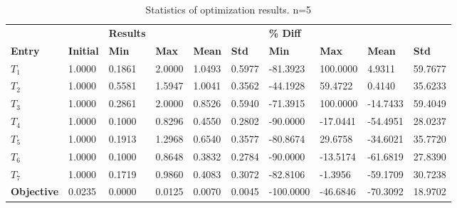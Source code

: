 \begin{table}[H]
\centering
\begin{tabular}{llllllllll}
\textbf{} & \textbf{} & \cellcolor[HTML]{EFEFEF}\textbf{Results} & \cellcolor[HTML]{EFEFEF} & \cellcolor[HTML]{EFEFEF} & \cellcolor[HTML]{EFEFEF} & \cellcolor[HTML]{EFEFEF}\textbf{\% Diff} & \cellcolor[HTML]{EFEFEF} & \cellcolor[HTML]{EFEFEF} & \cellcolor[HTML]{EFEFEF} \\
\rowcolor[HTML]{EFEFEF} 
\textbf{Entry} & \textbf{Initial} & \textbf{Min} & \textbf{Max} & \textbf{Mean} & \textbf{Std} & \textbf{Min} & \textbf{Max} & \textbf{Mean} & \textbf{Std} \\
$T_1$ & 1.0000 & 0.1861 & 2.0000 & 1.0493 & 0.5977 & -81.3923 & 100.0000 & 4.9311 & 59.7677 \\ 
$T_2$ & 1.0000 & 0.5581 & 1.5947 & 1.0041 & 0.3562 & -44.1928 & 59.4722 & 0.4140 & 35.6233 \\ 
$T_3$ & 1.0000 & 0.2861 & 2.0000 & 0.8526 & 0.5940 & -71.3915 & 100.0000 & -14.7433 & 59.4049 \\ 
$T_4$ & 1.0000 & 0.1000 & 0.8296 & 0.4550 & 0.2802 & -90.0000 & -17.0441 & -54.4951 & 28.0237 \\ 
$T_5$ & 1.0000 & 0.1913 & 1.2968 & 0.6540 & 0.3577 & -80.8674 & 29.6758 & -34.6021 & 35.7720 \\ 
$T_6$ & 1.0000 & 0.1000 & 0.8648 & 0.3832 & 0.2784 & -90.0000 & -13.5174 & -61.6819 & 27.8390 \\ 
$T_7$ & 1.0000 & 0.1719 & 0.9860 & 0.4083 & 0.3072 & -82.8106 & -1.3956 & -59.1709 & 30.7238 \\ 
\rowcolor[HTML]{EFEFEF} 
\textbf{Objective} & 0.0235 & 0.0000 & 0.0125 & 0.0070 & 0.0045 & -100.0000 & -46.6846 & -70.3092 & 18.9702 \\ 
\end{tabular}
\caption{Statistics of optimization results. n=5}
\label{tab:StatisticsOptimizationAnalysis}
\end{table}